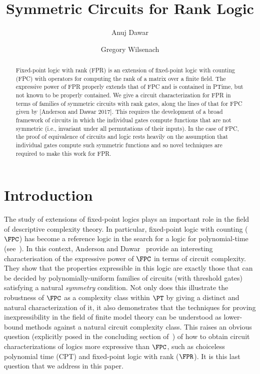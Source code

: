 \documentclass[a4paper,UKenglish]{lipics-v2018}
\title{Symmetric Circuits for Rank Logic}
\author{Anuj Dawar}{University of Cambridge Computer Laboratory\\{Cambridge,
    UK}}{anuj.dawar@cl.cam.ac.uk}{}{}%
\author{Gregory Wilsenach}{University of Cambridge Computer
  Laboratory\\{Cambridge, UK}}{gregory.wilsenach@cl.cam.ac.uk}{}{Funding
  provided by the Gates Cambridge Scholarship}
\begin{document}
\maketitle

\begin{abstract}
  Fixed-point logic with rank (FPR) is an extension of fixed-point logic with
  counting (FPC) with operators for computing the rank of a matrix over a finite
  field. The expressive power of FPR properly extends that of FPC and is
  contained in PTime, but not known to be properly contained. We give a circuit
  characterization for FPR in terms of families of symmetric circuits with rank
  gates, along the lines of that for FPC given by [Anderson and Dawar 2017].
  This requires the development of a broad framework of circuits in which the
  individual gates compute functions that are not symmetric (i.e., invariant
  under all permutations of their inputs). In the case of FPC, the proof of
  equivalence of circuits and logic rests heavily on the assumption that
  individual gates compute such symmetric functions and so novel techniques are
  required to make this work for FPR.
\end{abstract}

\section{Introduction}

The study of extensions of fixed-point logics plays an important role in the
field of descriptive complexity theory. In particular, fixed-point logic with
counting ($\FPC$) has become a reference logic in the search for a logic for
polynomial-time (see~\cite{Dawar-siglog}). In this context, Anderson and
Dawar~\cite{AndersonD17} provide an interesting characterisation of the
expressive power of $\FPC$ in terms of circuit complexity. They show that the
properties expressible in this logic are exactly those that can be decided by
polynomially-uniform families of circuits (with threshold gates) satisfying a
natural \emph{symmetry} condition. Not only does this illustrate the robustness
of $\FPC$ as a complexity class within $\PT$ by giving a distinct and natural
characterization of it, it also demonstrates that the techniques for proving
inexpressibility in the field of finite model theory can be understood as
lower-bound methods against a natural circuit complexity class. This raises an
obvious question (explicitly posed in the concluding section
of~\cite{AndersonD17}) of how to obtain circuit characterizations of logics more
expressive than $\FPC$, such as choiceless polynomial time (CPT) and fixed-point
logic with rank ($\FPR$). It is this last question that we address in this
paper.
\end{document}
